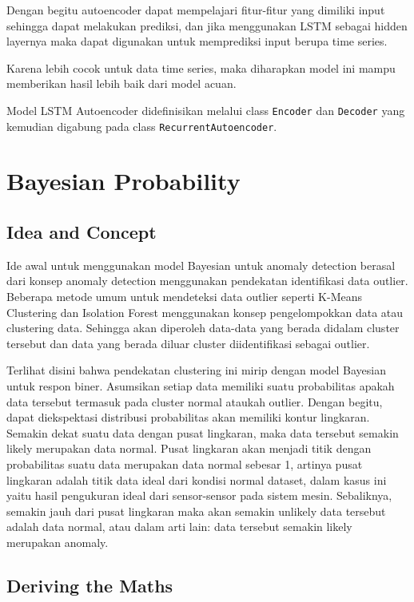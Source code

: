 Dengan begitu autoencoder dapat mempelajari fitur-fitur yang dimiliki input sehingga dapat melakukan prediksi, dan jika menggunakan LSTM sebagai hidden layernya maka dapat digunakan untuk memprediksi input berupa time series.

Karena lebih cocok untuk data time series, maka diharapkan model ini mampu memberikan hasil lebih baik dari model acuan.

Model LSTM Autoencoder didefinisikan melalui class \texttt{Encoder} dan \texttt{Decoder} yang kemudian digabung pada class \texttt{RecurrentAutoencoder}.

\section{Bayesian Probability}
\subsection{Idea and Concept}

Ide awal untuk menggunakan model Bayesian untuk anomaly detection berasal dari konsep anomaly detection menggunakan pendekatan identifikasi data outlier. Beberapa metode umum untuk mendeteksi data outlier seperti K-Means Clustering dan Isolation Forest menggunakan konsep pengelompokkan data atau clustering data. Sehingga akan diperoleh data-data yang berada didalam cluster tersebut dan data yang berada diluar cluster diidentifikasi sebagai outlier.

Terlihat disini bahwa pendekatan clustering ini mirip dengan model Bayesian untuk respon biner. Asumsikan setiap data memiliki suatu probabilitas apakah data tersebut termasuk pada cluster normal ataukah outlier. Dengan begitu, dapat diekspektasi distribusi probabilitas akan memiliki kontur lingkaran. Semakin dekat suatu data dengan pusat lingkaran, maka data tersebut semakin likely merupakan data normal. Pusat lingkaran akan menjadi titik dengan probabilitas suatu data merupakan data normal sebesar 1, artinya pusat lingkaran adalah titik data ideal dari kondisi normal dataset, dalam kasus ini yaitu hasil pengukuran ideal dari sensor-sensor pada sistem mesin. Sebaliknya, semakin jauh dari pusat lingkaran maka akan semakin unlikely data tersebut adalah data normal, atau dalam arti lain: data tersebut semakin likely merupakan anomaly.

\subsection{Deriving the Maths}

